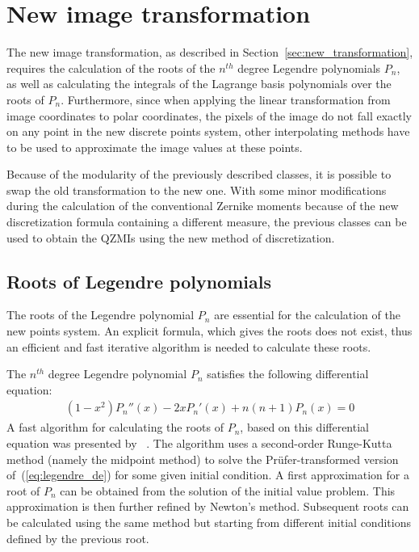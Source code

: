 \section{New image transformation}
The new image transformation, as described in Section~\ref{sec:new_transformation}, requires the calculation of the roots of the $n^{th}$ degree Legendre polynomials $P_n$, as well as calculating the integrals of the Lagrange basis polynomials over the roots of $P_n$. Furthermore, since when applying the linear transformation from image coordinates to polar coordinates, the pixels of the image do not fall exactly on any point in the new discrete points system, other interpolating methods have to be used to approximate the image values at these points.

Because of the modularity of the previously described classes, it is possible to swap the old transformation to the new one. With some minor modifications during the calculation of the conventional Zernike moments because of the new discretization formula containing a different measure, %
the previous classes can be used to obtain the QZMIs using the new method of discretization.

\subsection{Roots of Legendre polynomials}
The roots of the Legendre polynomial $P_n$ are essential for the calculation of the new points system. An explicit formula, which gives the roots does not exist, thus an efficient and fast iterative algorithm is needed to calculate these roots.

The $n^{th}$ degree Legendre polynomial $P_n$ satisfies the following differential equation:
\begin{gather}
    (1-x^2)P_n''(x) - 2xP_n'(x) + n(n+1)P_n(x) = 0\label{eq:legendre_de}
\end{gather}
A fast algorithm for calculating the roots of $P_n$, based on this differential equation was presented by \citeauthor{legendre_algo}~\cite{legendre_algo}. The algorithm uses a second-order Runge-Kutta method (namely the midpoint method) to solve the Prüfer-transformed version of~(\ref{eq:legendre_de}) for some given initial condition. A first approximation for a root of $P_n$ can be obtained from the solution of the initial value problem. This approximation is then further refined by Newton's method.
Subsequent roots can be calculated using the same method but starting from different initial conditions defined by the previous root.

